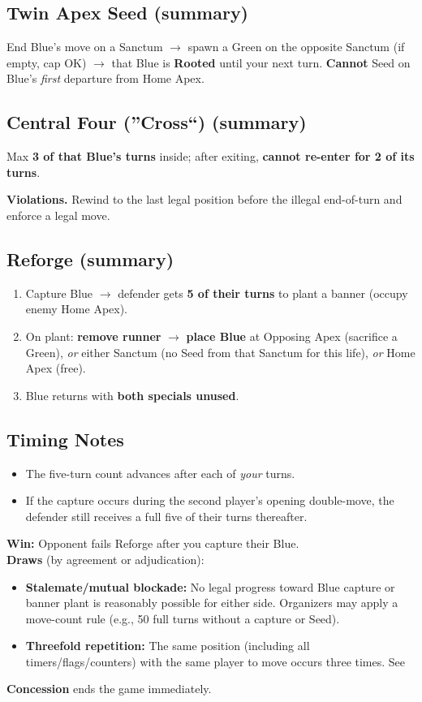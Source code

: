 \documentclass[11pt]{article}
\begin{document}
\subsection*{Twin Apex Seed (summary)}
End Blue's move on a Sanctum $\rightarrow$ spawn a Green on the opposite Sanctum (if empty, cap OK) $\rightarrow$ that Blue is \textbf{Rooted} until your next turn. \textbf{Cannot} Seed on Blue's \emph{first} departure from Home Apex.

\subsection*{Central Four (''Cross``) (summary)}
Max \textbf{3 of that Blue's turns} inside; after exiting, \textbf{cannot re-enter for 2 of its turns}.

\noindent\textbf{Violations.} Rewind to the last legal position before the illegal end-of-turn and enforce a legal move.

\subsection*{Reforge (summary)}
\begin{enumerate}
  \item Capture Blue $\rightarrow$ defender gets \textbf{5 of their turns} to plant a banner (occupy enemy Home Apex).
  \item On plant: \textbf{remove runner} $\rightarrow$ \textbf{place Blue} at Opposing Apex (sacrifice a Green), \emph{or} either Sanctum (no Seed from that Sanctum for this life), \emph{or} Home Apex (free).
  \item Blue returns with \textbf{both specials unused}.
\end{enumerate}

\subsection*{Timing Notes}
\begin{itemize}
  \item The five-turn count advances after each of \emph{your} turns.
  \item If the capture occurs during the second player's opening double-move, the defender still receives a full five of their turns thereafter.
\end{itemize}

\textbf{Win:} Opponent fails Reforge after you capture their Blue.\\
\textbf{Draws} (by agreement or adjudication):
\begin{itemize}
  \item \textbf{Stalemate/mutual blockade:} No legal progress toward Blue capture or banner plant is reasonably possible for either side. Organizers may apply a move-count rule (e.g., 50 full turns without a capture or Seed).
  \item \textbf{Threefold repetition:} The same position (including all timers/flags/counters) with the same player to move occurs three times. See 
\end{itemize}
\textbf{Concession} ends the game immediately.
\end{document}
